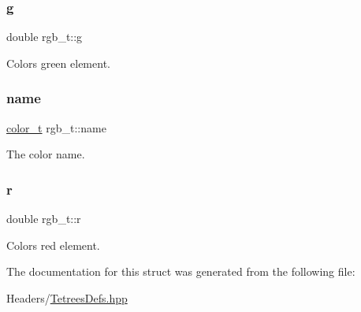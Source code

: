 \subsubsection{\texorpdfstring{g}{g}}
{\footnotesize\ttfamily double rgb\+\_\+t\+::g}

Color\textquotesingle{}s green element. \mbox{\label{structrgb__t_a98fbae1e6897105536340238b9660ba5}} 
\subsubsection{\texorpdfstring{name}{name}}
{\footnotesize\ttfamily \hyperlink{TetreesDefs_8hpp_a8ba5fbce2446135735693ab60c896bbd}{color\+\_\+t} rgb\+\_\+t\+::name}

The color name. \mbox{\label{structrgb__t_a89e46e1937cafe0683023100a5e1915a}} 
\subsubsection{\texorpdfstring{r}{r}}
{\footnotesize\ttfamily double rgb\+\_\+t\+::r}

Color\textquotesingle{}s red element. 

The documentation for this struct was generated from the following file\+:\begin{DoxyCompactItemize}
\item 
Headers/\hyperlink{TetreesDefs_8hpp}{Tetrees\+Defs.\+hpp}\end{DoxyCompactItemize}
